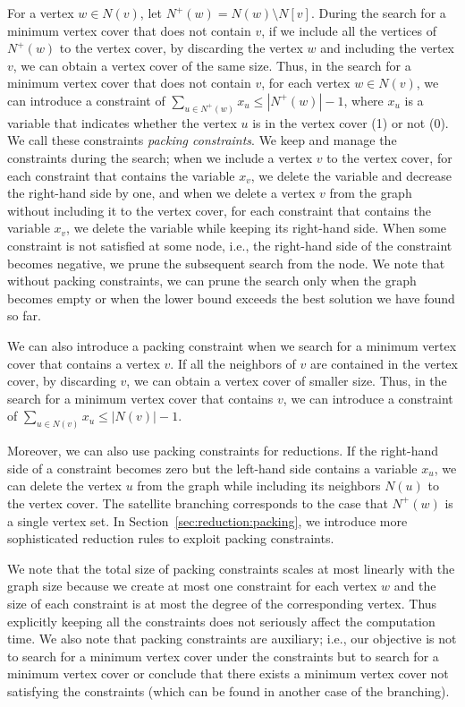 \documentclass[11pt]{article}
\begin{document}
For a vertex $w\in N(v)$, let $N^+(w)=N(w)\setminus N[v]$.
During the search for a minimum vertex cover that does not contain $v$, if we include all the vertices of
$N^+(w)$ to the vertex cover, by discarding the vertex $w$ and including the vertex $v$, we can obtain a vertex cover of
the same size.
Thus, in the search for a minimum vertex cover that does not contain $v$, for each vertex $w\in
N(v)$, we can introduce a constraint of $\sum_{u\in N^+(w)}x_u\leq |N^+(w)|-1$, where $x_u$ is a variable that indicates
whether the vertex $u$ is in the vertex cover (1) or not (0).
We call these constraints \emph{packing constraints}.
We keep and manage the constraints during the search;
when we include a vertex $v$ to the vertex cover, for each constraint that contains the variable $x_v$, we delete
the variable and decrease the right-hand side by one,
and when we delete a vertex $v$ from the graph without including it to the vertex cover,
for each constraint that contains the variable $x_v$, we delete the variable while keeping its right-hand side.
When some constraint is not satisfied at some node, i.e., the right-hand side of the constraint becomes negative, we
prune the subsequent search from the node.
We note that without packing constraints, we can prune the search only when the graph becomes empty or when the lower
bound exceeds the best solution we have found so far.

We can also introduce a packing constraint when we search for a minimum vertex cover that contains a vertex $v$.
If all the neighbors of $v$ are contained in the vertex cover, by discarding $v$, we can obtain a vertex cover of
smaller size.
Thus, in the search for a minimum vertex cover that contains $v$, we can introduce a constraint of $\sum_{u\in
N(v)}x_u\leq |N(v)|-1$.

Moreover, we can also use packing constraints for reductions.
If the right-hand side of a constraint becomes zero but the left-hand side contains a variable $x_u$, we can delete the
vertex $u$ from the graph while including its neighbors $N(u)$ to the vertex cover.
The satellite branching corresponds to the case that $N^+(w)$ is a single vertex set.
In Section~\ref{sec:reduction:packing}, we introduce more sophisticated reduction rules to exploit packing constraints.

We note that the total size of packing constraints scales at most linearly with the graph size because we create at most one
constraint for each vertex $w$ and the size of each constraint is at most the degree of the corresponding vertex.
Thus explicitly keeping all the constraints does not seriously affect the computation time.
We also note that packing constraints are auxiliary;
i.e., our objective is not to search for a minimum vertex cover under the constraints
but to search for a minimum vertex cover or conclude that there exists a minimum
vertex cover not satisfying the constraints (which can be found in another case of the branching).
\end{document}
